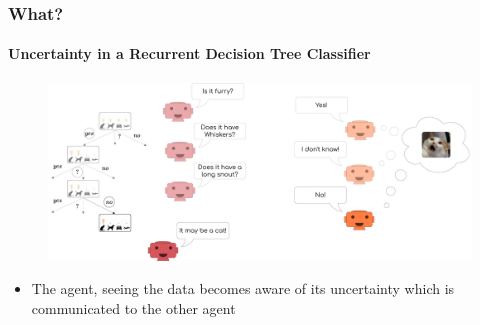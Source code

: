 \documentclass[9pt]{beamer}
\begin{document}
\begin{frame}
\frametitle{What?}
\framesubtitle{Uncertainty in a Recurrent Decision Tree Classifier}
\begin{figure}
	\centering
	\includegraphics[width=1\textwidth]{images/urdtc_intuition.pdf}
\end{figure}
\begin{itemize}\setlength\itemsep{1em}
	\item The agent, seeing the data becomes aware of its uncertainty which is communicated to the other agent
\end{itemize}
\end{frame} 
\end{document}
